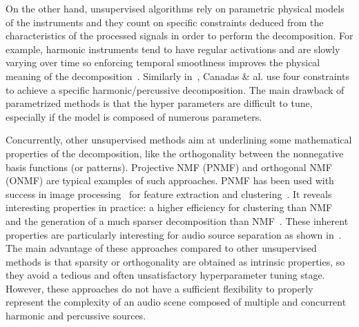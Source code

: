 On the other hand, unsupervised algorithms rely on parametric physical models of the instruments and they count on specific constraints deduced from the characteristics of the processed signals in order to perform the decomposition. For example, harmonic instruments tend to have regular activations and are slowly varying over time so enforcing temporal smoothness improves the physical meaning of the decomposition~\cite{Virtanen}. Similarly in~\cite{canadas2014percussive}, Canadas \& al. use four constraints to achieve a specific harmonic/percussive decomposition. The main drawback of parametrized methods is that the hyper parameters are difficult to tune, especially if the model is composed of numerous parameters. 

Concurrently, other unsupervised methods aim at underlining some mathematical properties of the decomposition, like the orthogonality between the nonnegative basis functions (or patterns). Projective NMF (PNMF) and orthogonal NMF (ONMF) are typical examples of such approaches. PNMF has been used with success in image processing~\cite{choi} for feature extraction and clustering~\cite{YangOja10}. It reveals interesting properties in practice: a higher efficiency for clustering than NMF~\cite{choi} and the generation of a much sparser decomposition than NMF~\cite{YangOja10}. These inherent properties are particularly interesting for audio source separation as shown in~\cite{canadas2014percussive,vincent2010adaptive}. 
The main advantage of these approaches compared to other unsupervised methods is that sparsity or orthogonality are obtained as intrinsic properties, so they avoid a tedious and often unsatisfactory hyperparameter tuning stage. However, these approaches do not have a sufficient flexibility to properly represent the complexity of an audio scene composed of multiple and concurrent harmonic and percussive sources.




